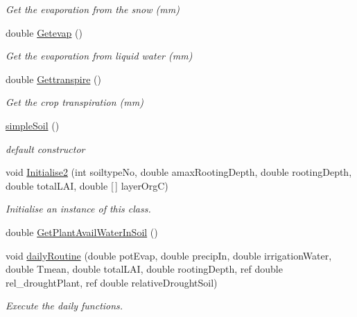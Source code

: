 \begin{DoxyCompactItemize}
\begin{DoxyCompactList}\small\item\em Get the evaporation from the snow (mm) \end{DoxyCompactList}\item 
double \mbox{\hyperlink{classsimplesoil_model_1_1simple_soil_a39baf3c0ecbb38d43dae18dedce649be}{Getevap}} ()
\begin{DoxyCompactList}\small\item\em Get the evaporation from liquid water (mm) \end{DoxyCompactList}\item 
double \mbox{\hyperlink{classsimplesoil_model_1_1simple_soil_a442e17dc9c07530c48ff41282a6851be}{Gettranspire}} ()
\begin{DoxyCompactList}\small\item\em Get the crop transpiration (mm) \end{DoxyCompactList}\item 
\mbox{\hyperlink{classsimplesoil_model_1_1simple_soil_a06e8097b093bfdc37b57abe418d8ca5f}{simple\+Soil}} ()
\begin{DoxyCompactList}\small\item\em default constructor \end{DoxyCompactList}\item 
void \mbox{\hyperlink{classsimplesoil_model_1_1simple_soil_ae4a82d34a86b81420ca86f7364038f57}{Initialise2}} (int soiltype\+No, double amax\+Rooting\+Depth, double rooting\+Depth, double total\+L\+AI, double \mbox{[}$\,$\mbox{]} layer\+OrgC)
\begin{DoxyCompactList}\small\item\em Initialise an instance of this class. \end{DoxyCompactList}\item 
double \mbox{\hyperlink{classsimplesoil_model_1_1simple_soil_a6209b0b03b7ffac86ceecf7bc1f3b8c0}{Get\+Plant\+Avail\+Water\+In\+Soil}} ()
\item 
void \mbox{\hyperlink{classsimplesoil_model_1_1simple_soil_a04390b2df05316b8bfee985a4d29e90a}{daily\+Routine}} (double pot\+Evap, double precip\+In, double irrigation\+Water, double Tmean, double total\+L\+AI, double rooting\+Depth, ref double rel\+\_\+drought\+Plant, ref double relative\+Drought\+Soil)
\begin{DoxyCompactList}\small\item\em Execute the daily functions. \end{DoxyCompactList}\item 

\end{DoxyCompactItemize}
